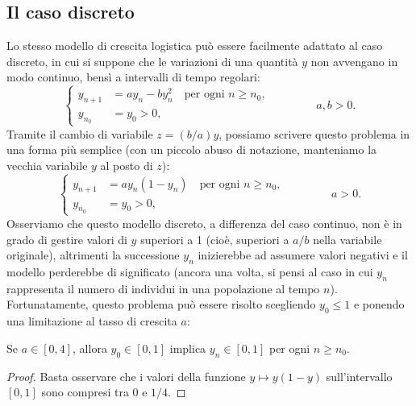 \subsection*{Il caso discreto}

Lo stesso modello di crescita logistica può essere facilmente adattato al caso
discreto, in cui si suppone che le variazioni di una quantità $y$ non
avvengano in modo continuo, bensì a intervalli di tempo regolari:
\[
\left\{
\begin{aligned}
y_{n+1} &= a y_n - b y_n^2 \quad \text{per ogni $n \geq n_0$}, \\
y_{n_0} &= y_0 > 0,
\end{aligned}
\right.
\qquad \qquad a,b > 0.
\]
Tramite il cambio di variabile $z = (b/a)y$, possiamo scrivere questo problema
in una forma più semplice (con un piccolo abuso di notazione, manteniamo la
vecchia variabile $y$ al posto di $z$):
\begin{equation} \label{eq:equazione-logistica-discreta}
\left\{
\begin{aligned}
y_{n+1} &= a y_n (1-y_n) \quad \text{per ogni $n \geq n_0$}, \\
y_{n_0} &= y_0 > 0,
\end{aligned}
\right.
\qquad \qquad a > 0.
\end{equation}
Osserviamo che questo modello discreto, a differenza del caso continuo,
non è in grado di gestire valori di $y$ superiori a 1 (cioè, superiori a $a/b$ nella
variabile originale), altrimenti la successione $y_n$ inizierebbe ad assumere
valori negativi e il modello perderebbe di significato (ancora una volta,
si pensi al caso in cui $y_n$ rappresenta il numero di individui in una
popolazione al tempo $n$). Fortunatamente, questo problema può essere risolto
scegliendo $y_0 	\leq 1$ e ponendo una limitazione al tasso di crescita $a$:

\begin{teor}
Se $a \in [0,4]$, allora $y_0 \in [0,1]$ implica $y_n \in [0,1]$ per ogni $n \geq n_0$.
\end{teor}

\begin{proof}
Basta osservare che i valori della funzione $y \mapsto y(1-y)$ sull'intervallo $[0,1]$
sono compresi tra $0$ e $1/4$.
\end{proof}


